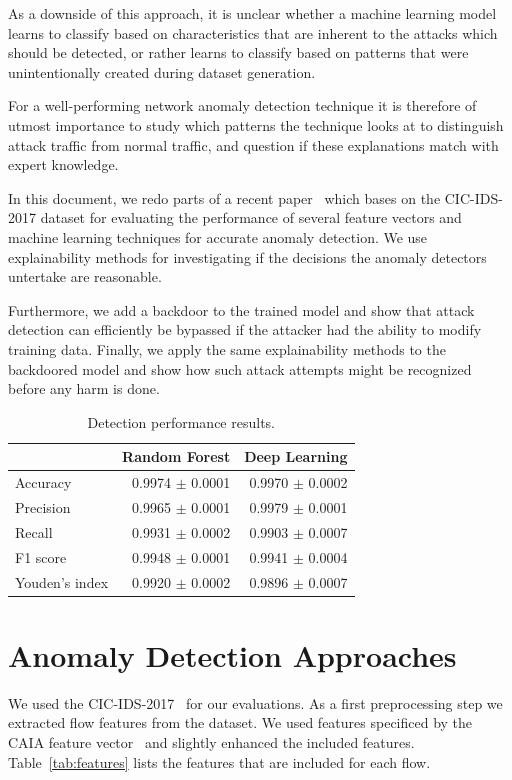 \documentclass[sigconf,nonacm]{acmart}
\begin{document}
As a downside of this approach, it is unclear whether a machine learning model learns to classify based on characteristics that are inherent to the attacks which should be detected, or rather learns to classify based on patterns that were unintentionally created during dataset generation.

For a well-performing network anomaly detection technique it is therefore of utmost importance to study which patterns the technique looks at to distinguish attack traffic from normal traffic, and question if these explanations match with expert knowledge.

In this document, we redo parts of a recent paper~\cite{fares} which bases on the CIC-IDS-2017 dataset \cite{Sharafaldin2018} for evaluating the performance of several feature vectors and machine learning techniques for accurate anomaly detection. We use explainability methods for investigating if the decisions the anomaly detectors untertake are reasonable.

Furthermore, we add a backdoor to the trained model and show that attack detection can efficiently be bypassed if the attacker had the ability to modify training data. Finally, we apply the same explainability methods to the backdoored model and show how such attack attempts might be recognized before any harm is done.


\begin{table}[b]
\caption{Detection performance results.} \label{tab:performance_results}
\begin{tabular}{l r r} \toprule
& Random Forest & Deep Learning \\ \midrule
Accuracy	&	0.9974 $\pm$ 0.0001	&	0.9970 $\pm$ 0.0002	\\
Precision	&	0.9965 $\pm$ 0.0001	&	0.9979 $\pm$ 0.0001	\\
Recall	&	0.9931 $\pm$ 0.0002	&	0.9903 $\pm$ 0.0007	\\
F1 score	&	0.9948 $\pm$ 0.0001	&	0.9941 $\pm$ 0.0004	\\
Youden's index	&	0.9920 $\pm$ 0.0002	&	0.9896 $\pm$ 0.0007	\\
\bottomrule
\end{tabular}
\end{table}

\section{Anomaly Detection Approaches} \label{sec:ml_approaches}
We used the CIC-IDS-2017~\cite{Sharafaldin2018} for our evaluations. As a first preprocessing step we extracted flow features from the dataset. We used features specificed by the CAIA feature vector~\cite{Williams2006} and slightly enhanced the included features. Table~\ref{tab:features} lists the features that are included for each flow.
\end{document}
